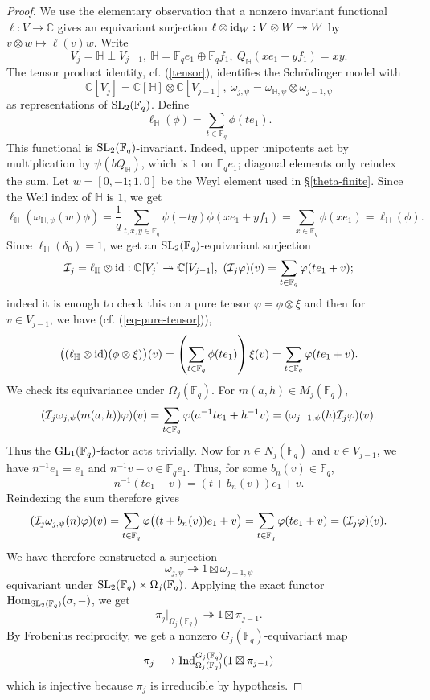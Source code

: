 \documentclass[12pt]{amsart}
\theoremstyle{definition}
\theoremstyle{remark}
\begin{document}
\begin{proof}
We use the elementary observation that a nonzero invariant functional $\ell:V \to\mathbb C$ gives an equivariant surjection
$
\ell\otimes {\rm id}_W:V\otimes W\twoheadrightarrow W$ by $v\otimes w\longmapsto\ell(v)w$. Write
\[
V_j=\mathbb H\perp V_{j-1},
~
\mathbb H=\mathbb F_qe_1\oplus\mathbb F_qf_1,
~
Q_{\mathbb H}(xe_1+yf_1)=xy.
\]
The tensor product identity, cf. (\ref{tensor}), identifies the Schrödinger model with
\[
\mathbb C[V_j]
=\mathbb C[\mathbb H]\otimes \mathbb C[V_{j-1}],
~
\omega_{j,\psi}
=\omega_{\mathbb H,\psi}\otimes\omega_{j-1,\psi}
\]
as representations of ${\rm SL}_2(\mathbb F_q)$. Define
\[
\ell_{\mathbb H}(\phi)
=\sum_{t\in\mathbb F_q}\phi(te_1).
\]
This functional is ${\rm SL}_2(\mathbb F_q)$-invariant. Indeed, upper unipotents act by multiplication by $\psi(bQ_{\mathbb H})$, which is $1$ on $\mathbb F_qe_1$; diagonal elements only reindex the sum. Let $w = [0, -1; 1, 0]$ be the Weyl element used in \S \ref{theta-finite}. Since the Weil index of $\mathbb H$ is $1$, we get
\[
\ell_{\mathbb H}(\omega_{\mathbb H,\psi}(w)\phi)
=\frac{1}{q}
\sum_{t,x,y\in\mathbb F_q}
\psi(-ty)\phi(xe_1+yf_1)
=\sum_{x\in\mathbb F_q}\phi(xe_1)
=\ell_{\mathbb H}(\phi).
\]
Since $\ell_{\mathbb H}(\delta_0)=1$, we get an ${\rm SL}_2(\mathbb F_q)$-equivariant surjection
\[
\mathcal I_j=\ell_{\mathbb H}\otimes {\rm id}:
\mathbb C[V_j]\twoheadrightarrow\mathbb C[V_{j-1}],
~
(\mathcal I_j\varphi)(v)
=\sum_{t\in\mathbb F_q}\varphi(te_1+v);
\]
indeed it is enough to check this on a pure tensor $\varphi = \phi \otimes \xi$ and then 
for $v\in V_{j-1}$, we have (cf. (\ref{eq-pure-tensor})),
\[
\bigl((\ell_{\mathbb H}\otimes {\rm id})(\phi\otimes \xi)\bigr)(v)
=\left(\sum_{t\in\mathbb F_q}\phi(te_1)\right)\xi(v)\\
=\sum_{t\in\mathbb F_q}\varphi(te_1+v).
\]
We check its equivariance under $\Omega_j(\mathbb F_q)$. For $m(a,h)\in M_j(\mathbb F_q)$,
\[
(\mathcal I_j\omega_{j,\psi}(m(a,h))\varphi)(v)
=\sum_{t\in\mathbb F_q}
\varphi(a^{-1}te_1+h^{-1}v)\\
=(\omega_{j-1,\psi}(h)\mathcal I_j\varphi)(v).
\]
Thus the ${\rm GL}_1(\mathbb F_q)$-factor acts trivially. 
Now for $n\in N_j(\mathbb F_q)$ and $v\in V_{j-1}$, we have
$
n^{-1}e_1=e_1$ and $n^{-1}v-v\in\mathbb F_qe_1$.
Thus, for some $b_n(v)\in\mathbb F_q$,
\[
n^{-1}(te_1+v)=(t+b_n(v))e_1+v.
\]
Reindexing the sum therefore gives
\[
(\mathcal I_j\omega_{j,\psi}(n)\varphi)(v)
=\sum_{t\in\mathbb F_q}
\varphi\bigl((t+b_n(v))e_1+v\bigr)\\
=\sum_{t\in\mathbb F_q}\varphi(te_1+v)
=(\mathcal I_j\varphi)(v).
\]
We have therefore constructed a surjection
\[
\omega_{j,\psi}\twoheadrightarrow
1\boxtimes\omega_{j-1,\psi}
\]
equivariant under
${\rm SL}_2(\mathbb F_q)\times\Omega_j(\mathbb F_q)$. Applying the exact functor
${\rm Hom}_{{\rm SL}_2(\mathbb F_q)}(\sigma,-)$, we get 
\[
\pi_j|_{\Omega_j(\mathbb F_q)}
\twoheadrightarrow 1\boxtimes\pi_{j-1}.
\] By Frobenius reciprocity, we get a nonzero $G_j(\mathbb F_q)$-equivariant map
\[
\pi_j\longrightarrow
{\rm Ind}_{\Omega_j(\mathbb F_q)}^{G_j(\mathbb F_q)}
( 1\boxtimes\pi_{j-1})
\]
which is injective because $\pi_j$ is irreducible by hypothesis.
\end{proof}
\end{document}
